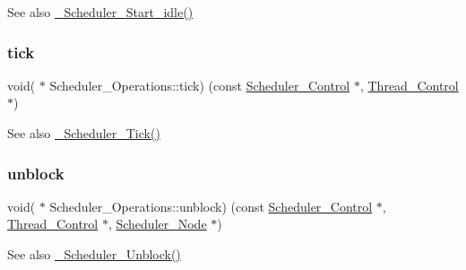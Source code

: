 \begin{DoxySeeAlso}{See also}
\mbox{\hyperlink{group__RTEMSScoreScheduler_ga2d5003279953db715bd577c4f25531b6}{\+\_\+\+Scheduler\+\_\+\+Start\+\_\+idle()}} 
\end{DoxySeeAlso}
\mbox{\label{structScheduler__Operations_acbdbe5ca6a61309b15e57f0b3924ecb0}} 
\subsubsection{\texorpdfstring{tick}{tick}}
{\footnotesize\ttfamily void( $\ast$ Scheduler\+\_\+\+Operations\+::tick) (const \mbox{\hyperlink{struct__Scheduler__Control}{Scheduler\+\_\+\+Control}} $\ast$, \mbox{\hyperlink{struct__Thread__Control}{Thread\+\_\+\+Control}} $\ast$)}

\begin{DoxySeeAlso}{See also}
\mbox{\hyperlink{group__RTEMSScoreScheduler_ga42c763a880e031610302ce44807c293b}{\+\_\+\+Scheduler\+\_\+\+Tick()}} 
\end{DoxySeeAlso}
\mbox{\label{structScheduler__Operations_a2e40ae42cf47217bb7ac159a23a3eac6}} 
\subsubsection{\texorpdfstring{unblock}{unblock}}
{\footnotesize\ttfamily void( $\ast$ Scheduler\+\_\+\+Operations\+::unblock) (const \mbox{\hyperlink{struct__Scheduler__Control}{Scheduler\+\_\+\+Control}} $\ast$, \mbox{\hyperlink{struct__Thread__Control}{Thread\+\_\+\+Control}} $\ast$, \mbox{\hyperlink{structScheduler__Node}{Scheduler\+\_\+\+Node}} $\ast$)}

\begin{DoxySeeAlso}{See also}
\mbox{\hyperlink{group__RTEMSScoreScheduler_ga8289b090b6cb3c711ba614a047d4a343}{\+\_\+\+Scheduler\+\_\+\+Unblock()}} 
\end{DoxySeeAlso}
\mbox{\label{structScheduler__Operations_a0ae7a36d2d16869978fadd9c9852ae89}} 
